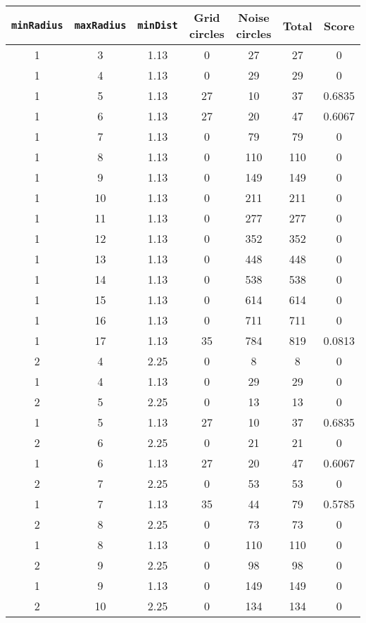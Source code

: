 \documentclass[letterpaper, 12pt]{article}
\begin{document}
\begin{longtable}{|c|c|c|c|c|c|c|}
\hline
\textbf{\texttt{minRadius}} & \textbf{\texttt{maxRadius}} & \textbf{\texttt{minDist}} & \textbf{Grid circles} & \textbf{Noise circles} & \textbf{Total} & \textbf{Score} \\
\hline
1 & 3 & 1.13 & 0 & 27 & 27 & 0 \\
\hline
1 & 4 & 1.13 & 0 & 29 & 29 & 0 \\
\hline
1 & 5 & 1.13 & 27 & 10 & 37 & 0.6835 \\
\hline
1 & 6 & 1.13 & 27 & 20 & 47 & 0.6067 \\
\hline
1 & 7 & 1.13 & 0 & 79 & 79 & 0 \\
\hline
1 & 8 & 1.13 & 0 & 110 & 110 & 0 \\
\hline
1 & 9 & 1.13 & 0 & 149 & 149 & 0 \\
\hline
1 & 10 & 1.13 & 0 & 211 & 211 & 0 \\
\hline
1 & 11 & 1.13 & 0 & 277 & 277 & 0 \\
\hline
1 & 12 & 1.13 & 0 & 352 & 352 & 0 \\
\hline
1 & 13 & 1.13 & 0 & 448 & 448 & 0 \\
\hline
1 & 14 & 1.13 & 0 & 538 & 538 & 0 \\
\hline
1 & 15 & 1.13 & 0 & 614 & 614 & 0 \\
\hline
1 & 16 & 1.13 & 0 & 711 & 711 & 0 \\
\hline
1 & 17 & 1.13 & 35 & 784 & 819 & 0.0813 \\
\hline
2 & 4 & 2.25 & 0 & 8 & 8 & 0 \\
\hline
1 & 4 & 1.13 & 0 & 29 & 29 & 0 \\
\hline
2 & 5 & 2.25 & 0 & 13 & 13 & 0 \\
\hline
1 & 5 & 1.13 & 27 & 10 & 37 & 0.6835 \\
\hline
2 & 6 & 2.25 & 0 & 21 & 21 & 0 \\
\hline
1 & 6 & 1.13 & 27 & 20 & 47 & 0.6067 \\
\hline
2 & 7 & 2.25 & 0 & 53 & 53 & 0 \\
\hline
1 & 7 & 1.13 & 35 & 44 & 79 & 0.5785 \\
\hline
2 & 8 & 2.25 & 0 & 73 & 73 & 0 \\
\hline
1 & 8 & 1.13 & 0 & 110 & 110 & 0 \\
\hline
2 & 9 & 2.25 & 0 & 98 & 98 & 0 \\
\hline
1 & 9 & 1.13 & 0 & 149 & 149 & 0 \\
\hline
2 & 10 & 2.25 & 0 & 134 & 134 & 0 \\

\end{longtable}
\end{document}
